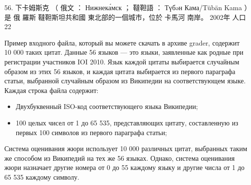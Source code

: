56. 下卡姆斯克 （ 俄文 ： Нижнека́мск ； 韃靼語 ： Түбəн Кама/Tübän Kama ）是 俄
羅斯 韃靼斯坦共和國 東北部的一個城市，位於 卡馬河 南岸。 2002年 人口22

Пример входного файла, который вы можете скачать в архиве grader, содержит 10 000 таких цитат. Данные 56 языков --- это языки, заявленные как родные при регистрации участников IOI 2010. Язык каждой цитаты выбирается случайным образом из этих 56 языков, и каждая цитата выбирается из первого параграфа статьи, выбранной случайным образом из Википедии на соответствующем языке. Каждая строка файла содержит:
\begin{itemize}
\item Двухбуквенный ISO-код соответствующего языка Википедии;
\item 100 целых чисел от 1 до 65 535, представляющих цитату, составленную из первых
100 символов из первого параграфа статьи;
\end{itemize}

Система оценивания жюри использует 10 000 различных цитат, выбранных таким же
способом из Википедий на тех же 56 языках. Однако, система оценивания жюри назначает
другие номера от 0 до 55 каждому языку и другие числа от 1 до 65 535 каждому символу. 
